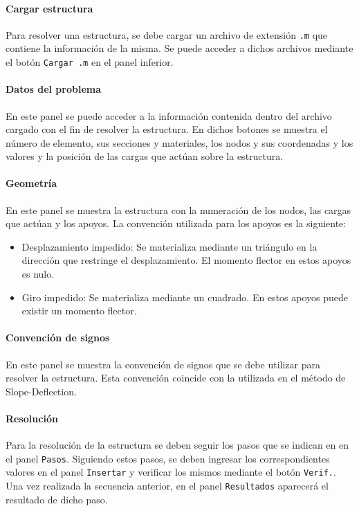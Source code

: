 \paragraph{Cargar estructura}
Para resolver una estructura, se debe cargar un archivo de extensión \verb|.m| que contiene la información de la misma. Se puede acceder a dichos archivos mediante el botón \verb|Cargar .m| en el panel inferior.

\paragraph{Datos del problema}
En este panel se puede acceder a la información contenida dentro del archivo cargado con el fin de resolver la estructura.
En dichos botones se muestra el número de elemento, sus secciones y materiales, los nodos y sus coordenadas y los valores y la posición de las cargas que actúan sobre la estructura.

\paragraph{Geometría}
En este panel se muestra la estructura con la numeración de los nodos, las cargas que actúan y los apoyos. La convención utilizada para los apoyos es la siguiente:
\begin{itemize}
	\item Desplazamiento impedido: Se materializa mediante un triángulo en la dirección que restringe el desplazamiento. El momento flector en estos apoyos es nulo.
	\item Giro impedido: Se materializa mediante un cuadrado. En estos apoyos puede existir un momento flector.  
\end{itemize}

\paragraph{Convención de signos}
En este panel se muestra la convención de signos que se debe utilizar para resolver la estructura. Esta convención coincide con la utilizada en el método de Slope-Deflection.

\paragraph{Resolución}
Para la resolución de la estructura se deben seguir los pasos que se indican en en el panel \verb|Pasos|. Siguiendo estos pasos, se deben ingresar los correspondientes valores en el panel \verb|Insertar| y verificar los mismos mediante el botón \verb|Verif.|. Una vez realizada la secuencia anterior, en el panel \verb|Resultados| aparecerá el resultado de dicho paso.

